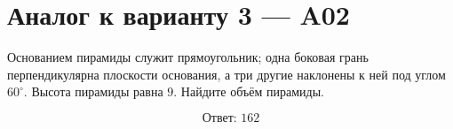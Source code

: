 \documentclass[12pt,a4paper]{article}
\begin{document}
\section*{Аналог к варианту 3 — A02}

Основанием пирамиды служит прямоугольник; одна боковая грань перпендикулярна плоскости основания, а три другие наклонены к ней под углом \(60^\circ\). Высота пирамиды равна \(9\). Найдите объём пирамиды.

\begin{center}
\end{center}

\[
\boxed{\text{Ответ: }162}
\]
\end{document}
